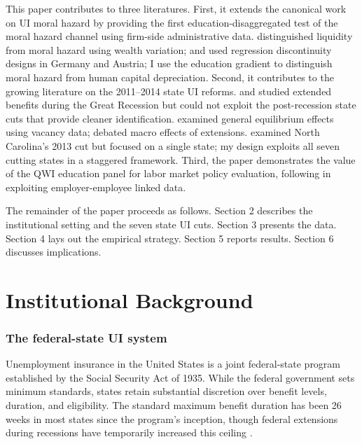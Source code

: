 \documentclass[12pt]{article}
\begin{document}
This paper contributes to three literatures. First, it extends the canonical work on UI moral hazard \citep{katz1990impact, chetty2008moral, schmieder2016effect, card2015effect} by providing the first education-disaggregated test of the moral hazard channel using firm-side administrative data. \citet{chetty2008moral} distinguished liquidity from moral hazard using wealth variation; \citet{schmieder2012effects} and \citet{lalive2006benefit} used regression discontinuity designs in Germany and Austria; I use the education gradient to distinguish moral hazard from human capital depreciation. Second, it contributes to the growing literature on the 2011--2014 state UI reforms. \citet{farber2015unemployment} and \citet{rothstein2011unemployment} studied extended benefits during the Great Recession but could not exploit the post-recession state cuts that provide cleaner identification. \citet{marinescu2017general} examined general equilibrium effects using vacancy data; \citet{hagedorn2013unemployment} debated macro effects of extensions. \citet{johnston2021unemployment} examined North Carolina's 2013 cut but focused on a single state; my design exploits all seven cutting states in a staggered framework. Third, the paper demonstrates the value of the QWI education panel for labor market policy evaluation, following \citet{abowd2009lehd} in exploiting employer-employee linked data.

The remainder of the paper proceeds as follows. Section 2 describes the institutional setting and the seven state UI cuts. Section 3 presents the data. Section 4 lays out the empirical strategy. Section 5 reports results. Section 6 discusses implications.


\section{Institutional Background}

\subsubsection*{The federal-state UI system} Unemployment insurance in the United States is a joint federal-state program established by the Social Security Act of 1935. While the federal government sets minimum standards, states retain substantial discretion over benefit levels, duration, and eligibility. The standard maximum benefit duration has been 26 weeks in most states since the program's inception, though federal extensions during recessions have temporarily increased this ceiling \citep{rothstein2011unemployment, chodorow2016limited}.
\end{document}

